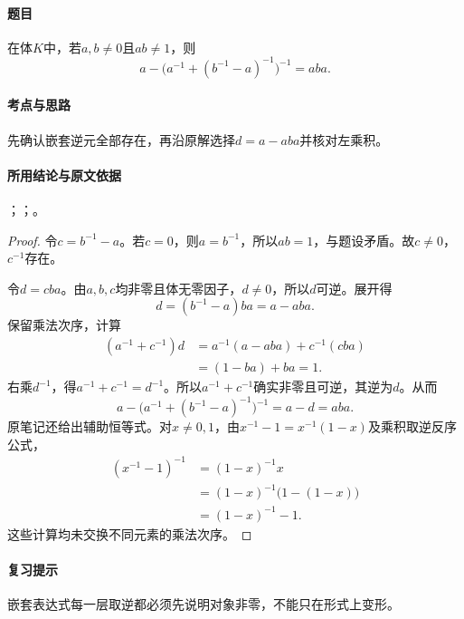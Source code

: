 \paragraph{题目}
在体$K$中，若$a,b\neq0$且$ab\neq1$，则
\[
a-\bigl(a^{-1}+(b^{-1}-a)^{-1}\bigr)^{-1}=aba.
\]

\paragraph{考点与思路}
先确认嵌套逆元全部存在，再沿原解选择$d=a-aba$并核对左乘积。

\paragraph{所用结论与原文依据}
；；。


\begin{proof}
令$c=b^{-1}-a$。若$c=0$，则$a=b^{-1}$，所以$ab=1$，与题设矛盾。故$c\ne0$，$c^{-1}$存在。

令$d=cba$。由$a,b,c$均非零且体无零因子，$d\ne0$，所以$d$可逆。展开得
\[
d=(b^{-1}-a)ba=a-aba.
\]
保留乘法次序，计算
\begin{align*}
(a^{-1}+c^{-1})d
&=a^{-1}(a-aba)+c^{-1}(cba)\\
&=(1-ba)+ba=1.
\end{align*}
右乘$d^{-1}$，得$a^{-1}+c^{-1}=d^{-1}$。所以$a^{-1}+c^{-1}$确实非零且可逆，其逆为$d$。从而
\[
a-\bigl(a^{-1}+(b^{-1}-a)^{-1}\bigr)^{-1}
=a-d=aba.
\]
原笔记还给出辅助恒等式。对$x\ne0,1$，由$x^{-1}-1=x^{-1}(1-x)$及乘积取逆反序公式，
\begin{align*}
(x^{-1}-1)^{-1}&=(1-x)^{-1}x\\
&=(1-x)^{-1}\bigl(1-(1-x)\bigr)\\
&=(1-x)^{-1}-1.
\end{align*}
这些计算均未交换不同元素的乘法次序。
\end{proof}

\paragraph{复习提示}
嵌套表达式每一层取逆都必须先说明对象非零，不能只在形式上变形。


